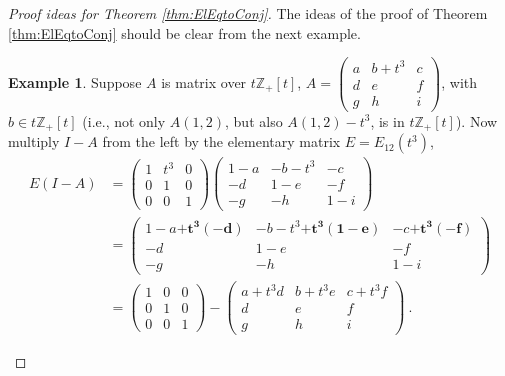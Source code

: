 \documentclass{amsart}
\theoremstyle{definition}
\newtheorem{ex}[equation]{Example}
\theoremstyle{definition}
\newcommand{\Z}{\mathbb Z}
\numberwithin{equation}{subsection}
\begin{document}
\begin{proof}[Proof ideas for Theorem \ref{thm:ElEqtoConj}]
The ideas of the proof of Theorem \ref{thm:ElEqtoConj}
should be clear from  the next example.
\begin{ex} \label{proofideasexample} Suppose $A$ is  matrix over
$t\Z_+[t]$,
$A=\begin{pmatrix} a&b+t^3 &c \\ d&e&f \\ g&h&i  \end{pmatrix} $,
with $b\in t\Z_+[t]$ (i.e., not only $A(1,2)$, but
also $A(1,2) -t^3$, is in  $t\Z_+[t]$).
Now multiply $I-A$ from the left by the elementary matrix
$E=E_{12}(t^3)$,
\begin{align*}
E(I-A) & =
\begin{pmatrix} 1&t^3&0 \\ 0&1&0\\ 0&0&1 \end{pmatrix}
\begin{pmatrix} 1-a&-b-t^3 &-c \\ -d&1-e&-f \\
-g&-h&1-i  \end{pmatrix} \\
&=       \begin{pmatrix} 1-a \mathbf{+ t^3(-d)}
&-b -t^3 \mathbf{+t^3(1-e)}
&-c \mathbf{+t^3(-f)} \\ -d&1-e&-f \\
-g&-h&1-i  \end{pmatrix}
\\
&=
\begin{pmatrix} 1&0&0 \\ 0&1&0\\ 0&0&1 \end{pmatrix} -
\begin{pmatrix} a +t^3d & b +t^3e &c +t^3f \\ d&e&f \\
g&h&i  \end{pmatrix}         \ .
\end{align*}


\end{ex}
\end{proof}
\end{document}
